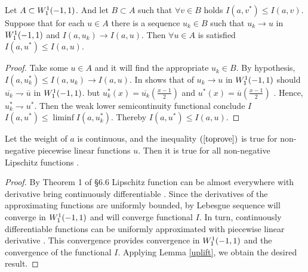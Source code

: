 \begin{lm}
\label{uplift}
Let $A \subset W_1^1(-1,1)$. And let $B \subset A$ such that
$\forall v \in B$ holds $I(a, v^*) \le I(a, v)$. Suppose that for each $u \in A$
there is a sequence $u_k \in B$ such that $u_k \to u$ in $W_1^1(-1, 1)$ and
$I(a, u_k) \to I(a, u)$. Then $\forall u \in A$ is satisfied $I(a, u^*) \le I(a, u)$.
\end{lm}
\begin{proof}
Take some $u \in A$ and it will find the appropriate $u_k \in B$.
By hypothesis, $I(a, u_k^*) \le I(a, u_k) \to I(a, u)$.
In \cite [ Theorem 1 ]{Br} shows that of $u_k \to u$ in $W_1^1(-1, 1)$ should
$\overline{u_k} \rightharpoondown \overline{u}$ in $W_1^1(-1, 1)$. but
$u_k^*( x ) = \overline{u_k}( \frac{x - 1}{2} )$ and
$u^*( x ) = \overline{u}( \frac{x - 1}{2} )$ . Hence,
$u_k^* \rightharpoondown u^*$. Then the weak lower semicontinuity
functional conclude $I$ $I(a, u^*) \le \liminf I(a, u_k^*)$. Thereby
$I(a, u^*) \le I(a, u)$.
\end{proof}

\begin{cor}
Let the weight of $a$ is continuous, and the inequality $(\ref{toprove})$ is true for non-negative piecewise linear functions $u$.
Then it is true for all non-negative Lipschitz functions .
\end{cor}
\begin{proof}
By Theorem 1 of \S6.6 \cite{Gariepy} Lipschitz function can be almost everywhere with derivative bring continuously differentiable .
Since the derivatives of the approximating functions are uniformly bounded,
by Lebesgue sequence will converge in $W_1^1(-1, 1)$
and will converge functional $I$.
In turn, continuously differentiable functions can be uniformly approximated with piecewise linear derivative .
This convergence provides convergence in $W_1^1(-1, 1)$ and the convergence of the functional $I$.
Applying Lemma \ref{uplift}, we obtain the desired result.
\end{proof}

